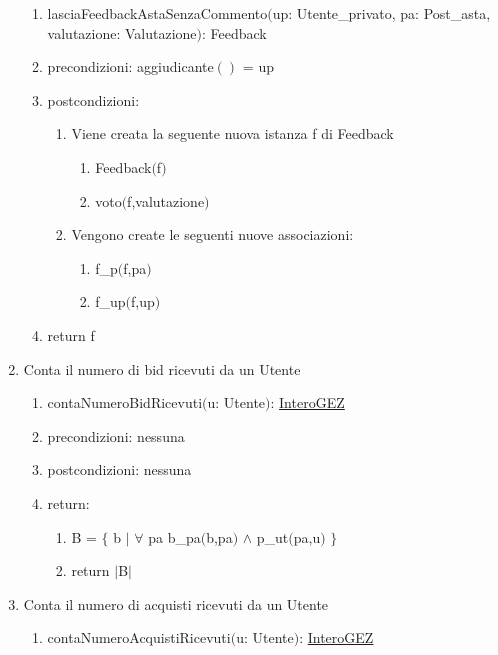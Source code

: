 \documentclass{article}
\begin{document}
\begin{enumerate}
\begin{enumerate}
        \item lasciaFeedbackAstaSenzaCommento$($up: Utente\_privato, pa: Post\_asta, valutazione: Valutazione$)$: Feedback
        \item precondizioni: aggiudicante$()$ = up
        \item postcondizioni:
        \begin{enumerate}
            \item Viene creata la seguente nuova istanza f di Feedback
            \begin{enumerate}
                \item Feedback$($f$)$
                \item voto$($f,valutazione$)$
            \end{enumerate}
            \item Vengono create le seguenti nuove associazioni:
            \begin{enumerate}
                \item f\_p$($f,pa$)$
                \item f\_up$($f,up$)$
            \end{enumerate}
        \end{enumerate}
        \item return f
    \end{enumerate}
    \newpage
    \item\label{sec:contaNumeroBidRicevuti} Conta il numero di bid ricevuti da un Utente
    \begin{enumerate}
        \item contaNumeroBidRicevuti$($u: Utente$)$: \hyperref[sec:TipoInteroGEZ]{InteroGEZ}
        \item precondizioni: nessuna
        \item postcondizioni: nessuna
        \item return:
        \begin{enumerate}
            \item B = $\{$ b $|$ $\forall$ pa b\_pa$($b,pa$)$ $\land$ p\_ut$($pa,u$)$ $\}$
            \item return $|$B$|$
        \end{enumerate}
    \end{enumerate}
    \newpage
    \item\label{sec:contaNumeroAcquistiRicevuti} Conta il numero di acquisti ricevuti da un Utente
    \begin{enumerate}
        \item contaNumeroAcquistiRicevuti$($u: Utente$)$: \hyperref[sec:TipoInteroGEZ]{InteroGEZ}

\end{enumerate}
\end{enumerate}
\end{document}
